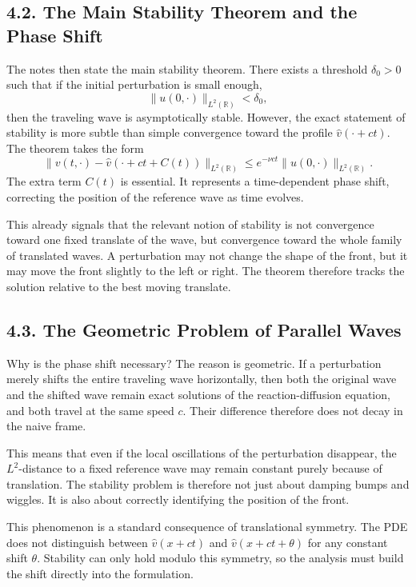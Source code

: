 \documentclass[11pt]{article}
\theoremstyle{definition}
\theoremstyle{remark}
\begin{document}
\subsection*{4.2. The Main Stability Theorem and the Phase Shift}
The notes then state the main stability theorem. There exists a threshold \(\delta_0>0\) such that if the initial perturbation is small enough,
\[
\|u(0,\cdot)\|_{L^2(\mathbb R)}<\delta_0,
\]
then the traveling wave is asymptotically stable. However, the exact statement of stability is more subtle than simple convergence toward the profile \(\widehat v(\cdot+ct)\). The theorem takes the form
\[
\|v(t,\cdot)-\widehat v(\cdot+ct+C(t))\|_{L^2(\mathbb R)}
\le e^{-\nu ct}\|u(0,\cdot)\|_{L^2(\mathbb R)}.
\]
The extra term \(C(t)\) is essential. It represents a time-dependent phase shift, correcting the position of the reference wave as time evolves.

This already signals that the relevant notion of stability is not convergence toward one fixed translate of the wave, but convergence toward the whole family of translated waves. A perturbation may not change the shape of the front, but it may move the front slightly to the left or right. The theorem therefore tracks the solution relative to the best moving translate.

\subsection*{4.3. The Geometric Problem of Parallel Waves}
Why is the phase shift necessary? The reason is geometric. If a perturbation merely shifts the entire traveling wave horizontally, then both the original wave and the shifted wave remain exact solutions of the reaction-diffusion equation, and both travel at the same speed \(c\). Their difference therefore does not decay in the naive frame.

This means that even if the local oscillations of the perturbation disappear, the \(L^2\)-distance to a fixed reference wave may remain constant purely because of translation. The stability problem is therefore not just about damping bumps and wiggles. It is also about correctly identifying the position of the front.

This phenomenon is a standard consequence of translational symmetry. The PDE does not distinguish between \(\widehat v(x+ct)\) and \(\widehat v(x+ct+\theta)\) for any constant shift \(\theta\). Stability can only hold modulo this symmetry, so the analysis must build the shift directly into the formulation.
\end{document}
